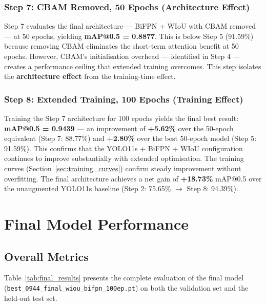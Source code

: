 \subsubsection{Step 7: CBAM Removed, 50 Epochs (Architecture Effect)}

Step 7 evaluates the final architecture — BiFPN + WIoU with CBAM removed — at 50 epochs, yielding \textbf{mAP@0.5 = 0.8877}. This is below Step 5 (91.59\%) because removing CBAM eliminates the short-term attention benefit at 50 epochs. However, CBAM's initialisation overhead — identified in Step 4 — creates a performance ceiling that extended training overcomes. This step isolates the \textbf{architecture effect} from the training-time effect.

\subsubsection{Step 8: Extended Training, 100 Epochs (Training Effect)}

Training the Step 7 architecture for 100 epochs yields the final best result: \textbf{mAP@0.5 = 0.9439} — an improvement of \textbf{+5.62\%} over the 50-epoch equivalent (Step 7: 88.77\%) and \textbf{+2.80\%} over the best 50-epoch model (Step 5: 91.59\%). This confirms that the YOLO11s + BiFPN + WIoU configuration continues to improve substantially with extended optimisation. The training curves (Section~\ref{sec:training_curves}) confirm steady improvement without overfitting. The final architecture achieves a net gain of \textbf{+18.73\%} mAP@0.5 over the unaugmented YOLO11s baseline (Step 2: 75.65\% $\to$ Step 8: 94.39\%).

\section{Final Model Performance}

\subsection{Overall Metrics}

Table~\ref{tab:final_results} presents the complete evaluation of the final model (\texttt{best\_0944\_final\_wiou\_bifpn\_100ep.pt}) on both the validation set and the held-out test set.

